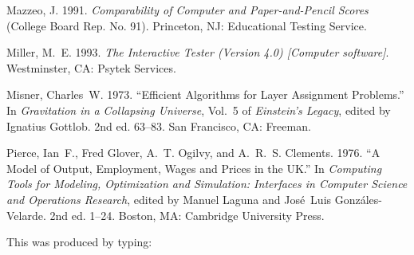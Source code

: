 \documentclass[]{tEIS2e}
\theoremstyle{plain}
\theoremstyle{remark}
\begin{document}
\begin{thebibliography}{12}
Mazzeo, J. 1991. \emph{Comparability of Computer and Paper-and-Pencil Scores}
 (College Board Rep. No. 91). Princeton, NJ: Educational Testing Service.

Miller, M.~E. 1993. \emph{The Interactive Tester (Version 4.0) [Computer
 software]}. Westminster, CA: Psytek Services.

Misner, Charles~W. 1973. ``Efficient Algorithms for Layer Assignment
 Problems.'' In \emph{Gravitation in a Collapsing {U}niverse}, Vol.~5 of
 \emph{Einstein's Legacy}, edited by Ignatius Gottlob. 2nd ed. 63--83. San
 Francisco, CA: Freeman.

Pierce, Ian~F., Fred Glover, A.~T. Ogilvy, and A.~R.~S. Clements. 1976.
 ``A Model of Output, Employment, Wages and Prices in the {UK}.'' In
 \emph{Computing Tools for Modeling, Optimization and Simulation: Interfaces
 in Computer Science and Operations Research}, edited by Manuel Laguna and
 Jos\'{e}~Luis Gonz\'{a}les-Velarde. 2nd ed. 1--24. Boston, MA:
 Cambridge University Press.

\end{thebibliography}

\bigskip
\noindent This was produced by typing:
\medskip
\end{document}
